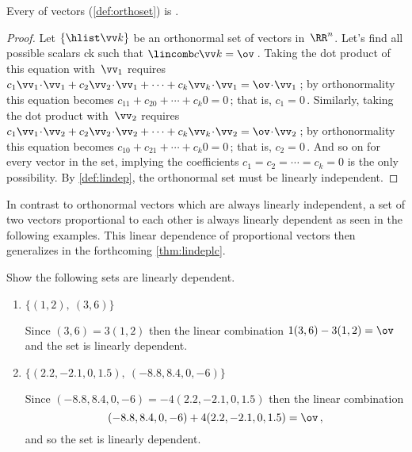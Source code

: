\begin{theorem} \label{thm:ortholi}
Every  of vectors (\cref{def:orthoset}) is .
\end{theorem}
\begin{proof} %
Let \(\{\hlist\vv k\}\) be an orthonormal set of vectors in~\(\RR^n\).
Let's find all possible scalars \hlist ck such that \(\lincomb c\vv k=\ov\)\,.
Taking the dot product of this equation with~\(\vv_1\) requires
\(c_1\vv_1\cdot\vv_1+c_2\vv_2\cdot\vv_1+\cdots+c_k\vv_k\cdot\vv_1=\ov\cdot\vv_1\)\,;
by orthonormality this equation becomes
\(c_11+c_20+\cdots+c_k0=0\)\,; that is, \(c_1=0\)\,.
Similarly, taking the dot product with~\(\vv_2\) requires
\(c_1\vv_1\cdot\vv_2+c_2\vv_2\cdot\vv_2+\cdots+c_k\vv_k\cdot\vv_2=\ov\cdot\vv_2\)\,;
by orthonormality this equation becomes
\(c_10+c_21+\cdots+c_k0=0\)\,; that is, \(c_2=0\)\,.
And so on for every vector in the set, implying the coefficients \(c_1=c_2=\cdots=c_k=0\) is the only possibility.
By \cref{def:lindep}, the orthonormal set must be linearly independent.
\end{proof}


In contrast to orthonormal vectors which are always linearly independent, a set of two vectors proportional to each other is always linearly dependent as seen in the following examples.
This linear dependence of proportional vectors then generalizes in the forthcoming \cref{thm:lindeplc}.




\begin{example} 
Show the following sets are linearly dependent.
\begin{enumerate}
\item \(\{(1,2),\ (3,6)\}\)
\begin{solution} 
Since \((3,6)=3(1,2)\) then the linear combination \(1(3,6)-3(1,2)=\ov\) and the set is linearly dependent. 
\end{solution}

\item \(\{(2.2,-2.1,0,1.5),\ (-8.8,8.4,0,-6)\}\)
\begin{solution} 
Since  \((-8.8,8.4,0,-6)=-4(2.2,-2.1,0,1.5)\) then the linear combination 
\begin{equation*}
(-8.8,8.4,0,-6)+4(2.2,-2.1,0,1.5)=\ov\,,
\end{equation*}
and so the set is linearly dependent.
\end{solution}
\end{enumerate}
\end{example}




